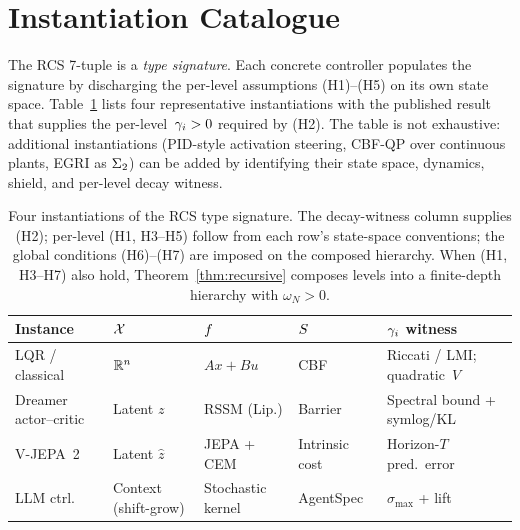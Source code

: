\documentclass[conference]{IEEEtran}
\begin{document}
\section{Instantiation Catalogue}
\label{sec:instantiations}

The RCS 7-tuple is a \emph{type signature}.  Each concrete controller
populates the signature by discharging the per-level assumptions
(H1)--(H5) on its own state space.  Table~\ref{tab:instantiations}
lists four representative instantiations with the published result
that supplies the per-level~$\gamma_i > 0$ required by (H2).  The
table is not exhaustive: additional instantiations (PID-style
activation steering, CBF-QP over continuous plants, EGRI as $\Sigma_2$)
can be added by identifying their state space, dynamics, shield, and
per-level decay witness.

\begin{table}[h]
\centering
\scriptsize
\setlength{\tabcolsep}{3pt}
\begin{tabular}{@{}p{1.0cm}p{1.1cm}p{1.4cm}p{1.3cm}p{2.4cm}@{}}
\toprule
\textbf{Instance} & \textbf{$\mathcal{X}$} & \textbf{$f$} & \textbf{$S$} & \textbf{$\gamma_i$ witness}\\
\midrule
LQR / classical
  & $\mathbb{R}^n$
  & $Ax+Bu$
  & CBF~\cite{ames2019cbf}
  & Riccati / LMI; quadratic~$V$~\cite{khalil2002nonlinear}\\
\addlinespace
Dreamer actor--critic
  & Latent $z$
  & RSSM (Lip.)
  & Barrier
  & Spectral bound + symlog/KL~\cite{hafner2025dreamerv3}\\
\addlinespace
V-JEPA~2
  & Latent $\hat z$
  & JEPA + CEM
  & Intrinsic cost
  & Horizon-$T$ pred.\ error~\cite{assran2025vjepa2}\\
\addlinespace
LLM ctrl.
  & Context (shift-grow)
  & Stochastic kernel~\cite{bhargava2023magic}
  & AgentSpec~\cite{wang2026agentspec}
  & $\sigma_{\max}$ + lift~\cite{soatto2023taming}\\
\bottomrule
\end{tabular}
\caption{Four instantiations of the RCS type signature.  The
decay-witness column supplies (H2); per-level (H1, H3--H5) follow from
each row's state-space conventions; the global conditions (H6)--(H7)
are imposed on the composed hierarchy.  When (H1, H3--H7) also hold,
Theorem~\ref{thm:recursive} composes levels into a finite-depth
hierarchy with $\omega_N > 0$.}
\label{tab:instantiations}
\end{table}
\end{document}
